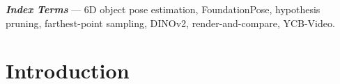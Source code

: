 \documentclass[10pt,twocolumn,letterpaper]{article}
\newcommand{\IEEEauthorblockN}[1]{{\normalsize #1}\par\vspace{2pt}}
\newcommand{\IEEEauthorblockA}[1]{{\small\itshape #1}\par}
\begin{document}
\newcommand{\PAPERTITLE}{Farthest-Point Hypothesis Pruning for Fast\\ Frame-0 Registration in FoundationPose}
\newcommand{\PAPERAUTHOR}{\IEEEauthorblockN{Hoàng Minh Khoa, Phạm Đức Dương, Nguyễn Đình Cao Minh,\\ Trần Hữu Lộc, Nguyễn Gia Bình}
\IEEEauthorblockA{Department of Electrical and Computer Engineering\\
Vietnamese-German University (VGU)\\
Technical Writing --- Group 40}}
\twocolumn[
\begin{@twocolumnfalse}
\vspace*{-6pt}
\begin{center}
{\LARGE\bfseries Farthest-Point Hypothesis Pruning for Fast\\ Frame-0 Registration in FoundationPose\par}\vspace{8pt}
{\normalsize Hoàng Minh Khoa, Phạm Đức Dương, Nguyễn Đình Cao Minh, Trần Hữu Lộc, Nguyễn Gia Bình\par}\vspace{3pt}
{\small\itshape Department of Electrical and Computer Engineering\\
Vietnamese-German University (VGU)\\
Technical Writing --- Group 40\par}
\end{center}
\vspace{10pt}
\end{@twocolumnfalse}
]



\noindent\small\textbf{\textit{Index Terms}} --- 6D object pose estimation, FoundationPose, hypothesis pruning, farthest-point sampling, DINOv2, render-and-compare, YCB-Video.
\par\normalsize\vspace{6pt}

\section{Introduction}
\end{document}
